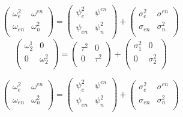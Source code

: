 \documentclass[12pt, a4paper]{report}
\theoremstyle{plain}
\theoremstyle{definition}
\theoremstyle{remark}
\begin{document}
\begin{equation}
\left( \begin{array}{cc}
\omega^2_{e} & \omega^{en} \\
\omega_{en} & \omega^2_{n} \\
\end{array}\right)
=
\left( \begin{array}{cc}
\psi^2_{e} & \psi^{en} \\
\psi_{en} & \psi^2_{n} \\
\end{array}\right)
+
\left( \begin{array}{cc}
\sigma^2_{e} & \sigma^{en} \\
\sigma_{en} & \sigma^2_{n} \\
\end{array}\right)
\end{equation}
\[\left(\begin{array}{cc}
\omega^1_2  & 0 \\
0 & \omega^2_2 \\
\end{array}  \right)
=  \left(
\begin{array}{cc}
\tau^2  & 0 \\
0 & \tau^2 \\
\end{array} \right)+
\left(
\begin{array}{cc}
\sigma^2_1  & 0 \\
0 & \sigma^2_2 \\
\end{array}\right)
\]


\begin{equation}
\left( \begin{array}{cc}
\omega^2_{e} & \omega^{en} \\
\omega_{en} & \omega^2_{n} \\
\end{array}\right)
=
\left( \begin{array}{cc}
\psi^2_{e} & \psi^{en} \\
\psi_{en} & \psi^2_{n} \\
\end{array}\right)
+
\left( \begin{array}{cc}
\sigma^2_{e} & \sigma^{en} \\
\sigma_{en} & \sigma^2_{n} \\
\end{array}\right)
\end{equation}
\end{document}
